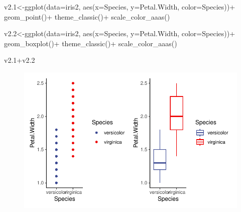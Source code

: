 \documentclass[
  letterpaper,
  DIV=11,
  numbers=noendperiod]{scrartcl}
\newenvironment{Shaded}{\begin{snugshade}}{\end{snugshade}}
\newcommand{\AttributeTok}[1]{\textcolor[rgb]{0.40,0.45,0.13}{#1}}
\newcommand{\FloatTok}[1]{\textcolor[rgb]{0.68,0.00,0.00}{#1}}
\newcommand{\FunctionTok}[1]{\textcolor[rgb]{0.28,0.35,0.67}{#1}}
\newcommand{\NormalTok}[1]{\textcolor[rgb]{0.00,0.23,0.31}{#1}}
\newcommand{\OtherTok}[1]{\textcolor[rgb]{0.00,0.23,0.31}{#1}}
\newcommand{\SpecialCharTok}[1]{\textcolor[rgb]{0.37,0.37,0.37}{#1}}
\begin{document}
\begin{Shaded}
\begin{Highlighting}[]
\NormalTok{v2}\FloatTok{.1}\OtherTok{\textless{}{-}}\FunctionTok{ggplot}\NormalTok{(}\AttributeTok{data=}\NormalTok{iris2, }\FunctionTok{aes}\NormalTok{(}\AttributeTok{x=}\NormalTok{Species, }\AttributeTok{y=}\NormalTok{Petal.Width, }\AttributeTok{color=}\NormalTok{Species))}\SpecialCharTok{+}
  \FunctionTok{geom\_point}\NormalTok{()}\SpecialCharTok{+}
  \FunctionTok{theme\_classic}\NormalTok{()}\SpecialCharTok{+}
  \FunctionTok{scale\_color\_aaas}\NormalTok{()}

\NormalTok{v2}\FloatTok{.2}\OtherTok{\textless{}{-}}\FunctionTok{ggplot}\NormalTok{(}\AttributeTok{data=}\NormalTok{iris2, }\FunctionTok{aes}\NormalTok{(}\AttributeTok{x=}\NormalTok{Species, }\AttributeTok{y=}\NormalTok{Petal.Width, }\AttributeTok{color=}\NormalTok{Species))}\SpecialCharTok{+}
  \FunctionTok{geom\_boxplot}\NormalTok{()}\SpecialCharTok{+}
  \FunctionTok{theme\_classic}\NormalTok{()}\SpecialCharTok{+}
  \FunctionTok{scale\_color\_aaas}\NormalTok{()}

\NormalTok{v2}\FloatTok{.1}\SpecialCharTok{+}\NormalTok{v2}\FloatTok{.2}
\end{Highlighting}
\end{Shaded}

\begin{figure}[H]

{\centering \includegraphics{t_test_files/figure-pdf/unnamed-chunk-12-1.pdf}

}

\end{figure}
\end{document}
